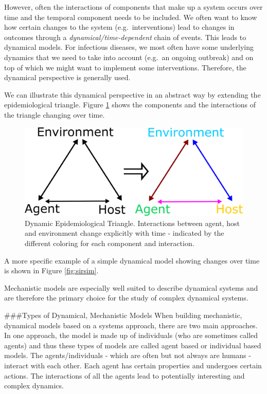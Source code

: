 \documentclass[]{book}
\theoremstyle{definition}
\theoremstyle{definition}
\theoremstyle{definition}
\theoremstyle{remark}
\begin{document}
However, often the interactions of components that make up a system
occurs over time and the temporal component needs to be included. We
often want to know how certain changes to the system
(e.g.~interventions) lead to changes in outcomes through a
\emph{dynamical/time-dependent} chain of events. This leads to dynamical
models. For infectious diseases, we most often have some underlying
dynamics that we need to take into account (e.g.~an ongoing outbreak)
and on top of which we might want to implement some interventions.
Therefore, the dynamical perspective is generally used.

We can illustrate this dynamical perspective in an abstract way by
extending the epidemiological triangle. Figure \ref{fig:dynamictriangle}
shows the components and the interactions of the triangle changing over
time.

\begin{figure}
\centering
\includegraphics{./images/moving-triangle.png}
\caption{\label{fig:dynamictriangle}Dynamic Epidemiological Triangle.
Interactions between agent, host and environment change explicitly with
time - indicated by the different coloring for each component and
interaction.}
\end{figure}

A more specific example of a simple dynamical model showing changes over
time is shown in Figure \ref{fig:sirsim}.

Mechanistic models are especially well suited to describe dynamical
systems and are therefore the primary choice for the study of complex
dynamical systems.

\#\#\#Types of Dynamical, Mechanistic Models When building mechanistic,
dynamical models based on a systems approach, there are two main
approaches. In one approach, the model is made up of individuals (who
are sometimes called agents) and thus these types of models are called
agent based or individual based models. The agents/individuals - which
are often but not always are humans - interact with each other. Each
agent has certain properties and undergoes certain actions. The
interactions of all the agents lead to potentially interesting and
complex dynamics.
\end{document}
